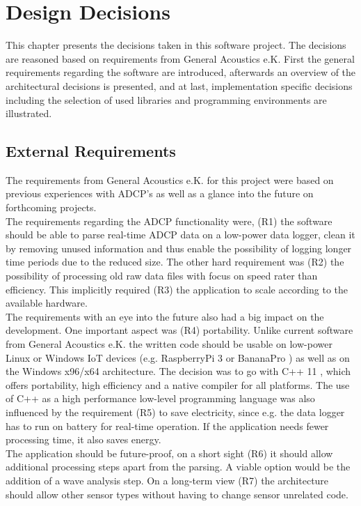
\chapter{Design Decisions}
This chapter presents the decisions taken in this software project. The decisions are reasoned based on requirements from General Acoustics e.K. First the general requirements regarding the software are introduced, afterwards an overview of the architectural decisions is presented, and at last, implementation specific decisions including the selection of used libraries and programming environments are illustrated. 
\section{External Requirements}
The requirements from General Acoustics e.K. for this project were based on previous experiences with ADCP's as well as a glance into the future on forthcoming projects.\\ 
The requirements regarding the ADCP functionality were, (R1) the software should be able to parse real-time ADCP data on a low-power data logger, clean it by removing unused information and thus enable the possibility of logging longer time periods due to the reduced size. The other hard requirement was (R2) the possibility of processing old raw data files with focus on speed rater than efficiency. This implicitly required (R3) the application to scale according to the available hardware.\\ 
The requirements with an eye into the future also had a big impact on the development. One important aspect was (R4) portability. Unlike current software from General Acoustics e.K. the written code should be usable on low-power Linux or Windows IoT devices (e.g. RaspberryPi 3 \cite{raspberry} or BananaPro \cite{bananapro}) as well as on the Windows x96/x64 architecture. The decision was to go with C++ 11 \cite{cpp_11}, which offers portability, high efficiency and a native compiler for all platforms. The use of C++ as a high performance low-level programming language was also influenced by the requirement (R5) to save electricity, since e.g. the data logger has to run on battery for real-time operation. If the application needs fewer processing time, it also saves energy. \\
The application should be future-proof, on a short sight (R6) it should allow additional processing steps apart from the parsing. A viable option would be the addition of a wave analysis step. On a long-term view (R7) the architecture should allow other sensor types without having to change sensor unrelated code.


